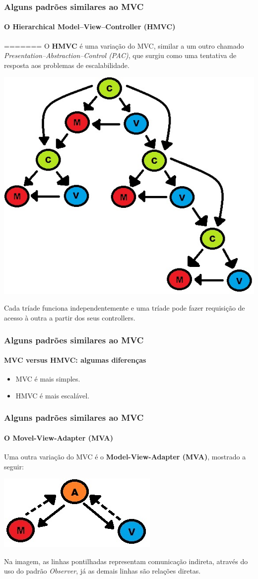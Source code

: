 \documentclass{beamer}
\begin{document}
\begin{frame}
\frametitle{Alguns padrões similares ao MVC}
\framesubtitle{O Hierarchical Model–View–Controller (HMVC)}
=======
	O \textbf{HMVC} é uma variação do MVC, similar a um outro chamado \textit{Presentation–Abstraction–Control (PAC)}, que surgiu como uma tentativa de resposta aos problemas de escalabilidade.
	\begin{center}
		\includegraphics[scale=0.175]{HMVC.jpg}
	\end{center}
	Cada tríade funciona independentemente e uma tríade pode fazer requisição de acesso à outra a partir dos seus controllers.
\end{frame}

\begin{frame}
\frametitle{Alguns padrões similares ao MVC}
\framesubtitle{MVC versus HMVC: algumas diferenças}
	\begin{itemize}
	\item MVC é mais simples.
	\item HMVC é mais escalável.
\end{itemize}
\end{frame}

\begin{frame}
\frametitle{Alguns padrões similares ao MVC}
\framesubtitle{O Movel-View-Adapter (MVA)}
	Uma outra variação do MVC é o \textbf{Model-View-Adapter (MVA)}, mostrado a seguir:
	\begin{center}
		\includegraphics[scale=0.4]{MVA.jpg}
	\end{center}
	Na imagem, as linhas pontilhadas representam comunicação indireta, através do uso do padrão \textit{Observer}, já as demais linhas são relações diretas.
\end{frame}
\end{document}
